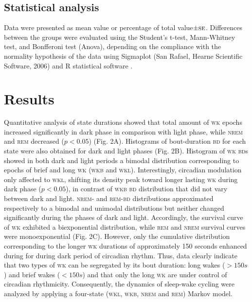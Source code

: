 \documentclass[10pt,letterpaper]{article}
\def\REM/{\textsc{rem}}
\def\NREM/{\textsc{nrem}}
\def\WK/{\textsc{wk}}
\def\WKL/{\textsc{wkl}}
\def\WKB/{\textsc{wkb}}
\def\BD/{\textsc{bd}}
\begin{document}
\subsection{Statistical analysis}

Data were presented as mean value or percentage of total value$\pm \textsc{se}$. Differences between the groups were evaluated using the Student's t-test, Mann-Whitney test, and Bonfferoni test (Anova), depending on the compliance with the normality hypothesis of the data using  Sigmaplot (San Rafael, Hearne Scientific Software, 2006) and R statistical software \cite{R2008}. 

\section{Results}

Quantitative analysis of state durations showed that total amount of \WK/ epochs increased significantly in dark phase in comparison with light phase, while \NREM/ and \REM/ decreased ($p < 0.05$) (Fig. 2A). Histograms of bout-duration \BD/ for each state were also obtained for dark and light phases (Fig. 2B). Histogram of \WK/  \BD/s showed in both dark and light periods a bimodal distribution corresponding to epochs of brief and long \WK/  (\WKB/  and \WKL/). Interestingly, circadian modulation only affected to \WKL/, shifting its density peak toward longer lasting \WK/ during dark phase ($p < 0.05$), in contrast of \WKB/ \BD/  distribution that did not vary between dark and light. \NREM/- and \REM/-\BD/ distributions approximated respectively to a bimodal and unimodal distributions but neither changed significantly during the phases of dark and light. Accordingly, the survival curve of \WK/ exhibited a biexponential distribution, while \REM/ and \NREM/ survival curves were monoexponential (Fig. 2C). However, only the cumulative distribution corresponding to the longer \WK/  durations of approximately 150 seconds enhanced during for during dark period of circadian rhythm. Thus, data clearly indicate that two types of \WK/ can be segregated by its bout duration: long wakes ($> 150s$) and brief wakes ($< 150s$) and that only the long \WK/ are under control of circadian rhythmicity. Consequently, the dynamics of sleep-wake cycling were analyzed by applying a four-state (\WKL/, \WKB/, \NREM/ and \REM/) Markov model. 
\end{document}
